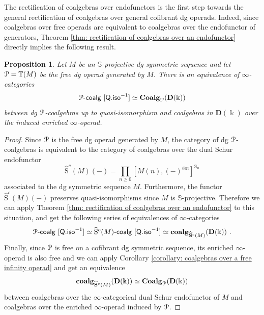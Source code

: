 \documentclass[a4paper,12pt]{amsart}
\renewcommand{\mathcal}{\EuScript}
\theoremstyle{plain}
\newtheorem{proposition}[theorem]{Proposition}%
\theoremstyle{definition}
\theoremstyle{remark}
\newcommand{\kk}{\Bbbk}
\begin{document}
The rectification of coalgebras over endofunctors is the first step towards the general rectification of coalgebras over general cofibrant dg operads. Indeed, since coalgebras over free operads are equivalent to coalgebras over the endofunctor of generators, Theorem \ref{thm: rectification of coalgebras over an endofunctor} directly implies the following result. 

\begin{proposition}\label{prop: rectification of coalgebras over free operads}
Let $M$ be an $\mathbb{S}$-projective dg symmetric sequence and let $\mathcal{P} = \mathbb{T}(M)$ be the free dg operad generated by $M$. There is an equivalence of $\infty$-categories
\[
\mathcal{P}\text{-}\mathsf{coalg}~[\mathsf{Q.iso}^{-1}] \simeq \mathbf{Coalg}_{\mathcal{P}}(\mathbf{D}(\kk))
\]
between dg $\mathcal{P}$-coalgebras up to quasi-isomorphism and coalgebras in $\mathbf{D}(\kk)$ over the induced enriched $\infty$-operad. 
\end{proposition}

\begin{proof}
Since $\mathcal{P}$ is the free dg operad generated by $M$, the category of dg $\mathcal{P}$-coalgebras is equivalent to the category of coalgebras over the dual Schur endofunctor 
\[
\widehat{\mathrm{S}}^c(M)(-) = \prod_{n\geq 0} [M(n),(-)^{\otimes n}]^{\mathbb{S}_n}
\]
associated to the dg symmetric sequence $M$. Furthermore, the functor $\widehat{\mathrm{S}}^c(M)(-)$ preserves quasi-isomorphisms since $M$ is $\mathbb{S}$-projective. Therefore we can apply Theorem \ref{thm: rectification of coalgebras over an endofunctor} to this situation, and get the following series of equivalences of $\infty$-categories
\[
\mathcal{P}\text{-}\mathsf{coalg}~[\mathsf{Q.iso}^{-1}] \simeq \widehat{\mathrm{S}}^c(M)\text{-}\mathsf{coalg}~[\mathsf{Q.iso}^{-1}] \simeq \mathbf{coalg}_{\widehat{\mathbf{S}}^c(M)}(\mathbf{D}(\kk))~. 
\]
Finally, since $\mathcal{P}$ is free on a cofibrant dg symmetric sequence, its enriched $\infty$-operad is also free and we can apply Corollary \ref{corollary: coalgebras over a free infinity operad} and get an equivalence 
\[
\mathbf{coalg}_{\widehat{\mathbf{S}}^c(M)}(\mathbf{D}(\kk)) \simeq \mathbf{Coalg}_{\mathcal{P}}(\mathbf{D}(\kk))
\]
between coalgebras over the $\infty$-categorical dual Schur endofunctor of $M$ and coalgebras over the enriched $\infty$-operad induced by $\mathcal{P}$. 
\end{proof}
\end{document}
